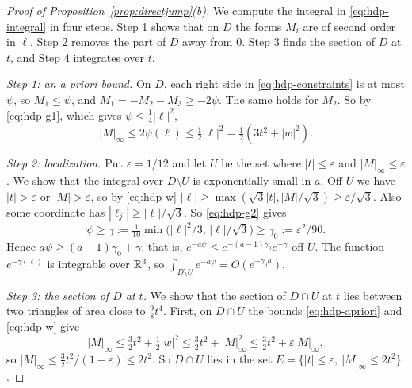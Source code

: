 \begin{proof}[Proof of Proposition~\ref{prop:directjump}(b)]
We compute the integral in \eqref{eq:hdp-integral} in four steps. Step 1 shows
that on $D$ the forms $M_i$ are of second order in $\ell$. Step 2 removes the
part of $D$ away from $0$. Step 3 finds the section of $D$ at $t$, and Step 4
integrates over $t$.

\emph{Step 1: an a priori bound.} On $D$, each right side
in \eqref{eq:hdp-constraints} is at most $\psi$, so $M_1\le\psi$, and
$M_1=-M_2-M_3\ge-2\psi$. The same holds for $M_2$. So by \eqref{eq:hdp-g1},
which gives $\psi\le\frac14|\ell|^2$,
\begin{equation}\label{eq:hdp-apriori}
 |M|_\infty\le2\psi(\ell)\le\tfrac12|\ell|^2=\tfrac12(3t^2+|w|^2).
\end{equation}

\emph{Step 2: localization.} Put $\varepsilon=1/12$ and let $U$ be the set
where $|t|\le\varepsilon$ and $|M|_\infty\le\varepsilon$. We show that the
integral over $D\setminus U$ is exponentially small in $a$. Off $U$ we have
$|t|>\varepsilon$ or $|M|>\varepsilon$, so by \eqref{eq:hdp-w}
$|\ell|\ge\max(\sqrt3|t|,|M|/\sqrt3)\ge\varepsilon/\sqrt3$. Also some
coordinate has $|\ell_j|\ge|\ell|/\sqrt3$. So \eqref{eq:hdp-g2} gives
\[
 \psi\ge\gamma:=\tfrac1{10}\min\bigl(|\ell|^2/3,\,|\ell|/\sqrt3\bigr)
 \ge\gamma_0:=\varepsilon^2/90 .
\]
Hence $a\psi\ge(a-1)\gamma_0+\gamma$, that is,
$e^{-a\psi}\le e^{-(a-1)\gamma_0}e^{-\gamma}$ off $U$. The function
$e^{-\gamma(\ell)}$ is integrable over $\mathbb R^3$, so
$\int_{D\setminus U}e^{-a\psi}=O(e^{-\gamma_0a})$.

\emph{Step 3: the section of $D$ at $t$.} We show that the section of
$D\cap U$ at $t$ lies between two triangles of area close to $\frac98t^4$.
First, on $D\cap U$ the bounds \eqref{eq:hdp-apriori} and \eqref{eq:hdp-w} give
\[
 |M|_\infty\le\tfrac32t^2+\tfrac12|w|^2\le\tfrac32t^2+|M|_\infty^2
 \le\tfrac32t^2+\varepsilon|M|_\infty,
\]
so $|M|_\infty\le\frac32t^2/(1-\varepsilon)\le2t^2$. So $D\cap U$ lies in the
set $E=\{|t|\le\varepsilon,\ |M|_\infty\le2t^2\}$.


\end{proof}
